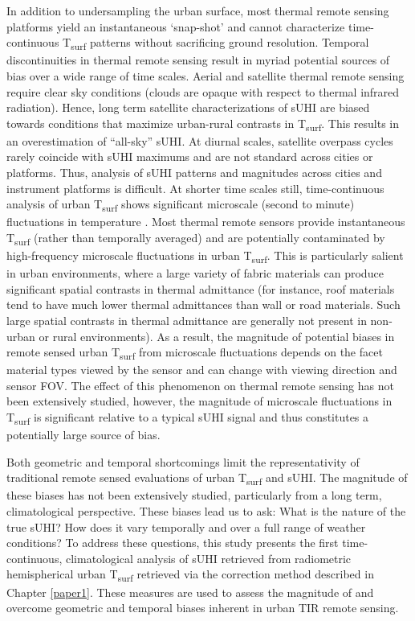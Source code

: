 \begin{bibunit}
In addition to undersampling the urban surface, most thermal remote sensing platforms yield an instantaneous ‘snap-shot’ and cannot characterize time-continuous T\textsubscript{surf} patterns without sacrificing ground resolution. Temporal discontinuities in thermal remote sensing result in myriad potential sources of bias over a wide range of time scales. Aerial and satellite thermal remote sensing require clear sky conditions (clouds are opaque with respect to thermal infrared radiation). Hence, long term satellite characterizations of sUHI are biased towards conditions that maximize urban-rural contrasts in T\textsubscript{surf}. This results in an overestimation of “all-sky” sUHI. At diurnal scales, satellite overpass cycles rarely coincide with sUHI maximums and are not standard across cities or platforms. Thus, analysis of sUHI patterns and magnitudes across cities and instrument platforms is difficult. At shorter time scales still, time-continuous analysis of urban T\textsubscript{surf} shows significant microscale (second to minute) fluctuations in temperature \citep{Christen2012}. Most thermal remote sensors provide instantaneous T\textsubscript{surf} (rather than temporally averaged) and are potentially contaminated by high-frequency microscale fluctuations in urban T\textsubscript{surf}. This is particularly salient in urban environments, where a large variety of fabric materials can produce significant spatial contrasts in thermal admittance (for instance, roof materials tend to have much lower thermal admittances than wall or road materials. Such large spatial contrasts in thermal admittance are generally not present in non-urban or rural environments). As a result, the magnitude of potential biases in remote sensed urban T\textsubscript{surf} from microscale fluctuations depends on the facet material types viewed by the sensor and can change with viewing direction and sensor FOV. The effect of this phenomenon on thermal remote sensing has not been extensively studied, however, the magnitude of microscale fluctuations in T\textsubscript{surf} is significant relative to a typical sUHI signal and thus constitutes a potentially large source of bias.

Both geometric and temporal shortcomings limit the representativity of traditional remote sensed evaluations of urban T\textsubscript{surf} and sUHI. The magnitude of these biases has not been extensively studied, particularly from a long term, climatological perspective. These biases lead us to ask: What is the nature of the true sUHI? How does it vary temporally and over a full range of weather conditions? To address these questions, this study presents the first time-continuous, climatological analysis of sUHI retrieved from radiometric hemispherical urban T\textsubscript{surf} retrieved via the correction method described in Chapter \ref{paper1}. These measures are used to assess the magnitude of and overcome geometric and temporal biases inherent in urban TIR remote sensing.


\end{bibunit}
